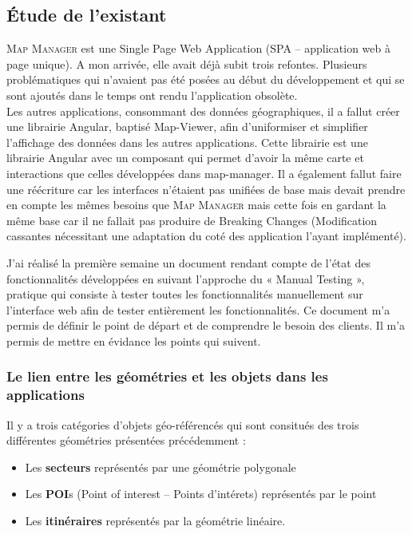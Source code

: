 \documentclass{rapportUHA40}
\begin{document}
\subsection{Étude de l'existant}
\textsc{Map Manager} est une Single Page Web Application (SPA – application web à page
unique). A mon arrivée, elle avait déjà subit trois refontes. Plusieurs
problématiques qui n'avaient pas été posées au début du développement et qui se
sont ajoutés dans le temps ont rendu l'application obsolète. \\

Les autres applications, consommant des données géographiques, il a fallut
créer une librairie Angular, baptisé Map-Viewer, afin d'uniformiser et
simplifier l'affichage des données dans les autres applications. Cette
librairie est une librairie Angular avec un composant qui permet d'avoir la
même carte et interactions que celles développées dans map-manager. Il a
également fallut faire une réécriture car les interfaces n'étaient pas unifiées
de base mais devait prendre en compte les mêmes besoins que \textsc{Map
  Manager} mais cette fois en gardant la même base car il ne fallait pas produire
de Breaking Changes (Modification cassantes nécessitant une adaptation du coté
des application l'ayant implémenté).

J’ai réalisé la première semaine un document rendant compte de l’état des
fonctionnalités développées en suivant l’approche du « Manual Testing »,
pratique qui consiste à tester toutes les fonctionnalités manuellement sur
l’interface web afin de tester entièrement les fonctionnalités. Ce document m’a
permis de définir le point de départ et de comprendre le besoin des clients. Il
m'a permis de mettre en évidance les points qui suivent.

\subsubsection{Le lien entre les géométries et les objets dans les applications}
Il y a trois catégories d'objets géo-référencés qui sont consitués des trois
différentes géométries présentées précédemment :
\begin{itemize}
  \item Les \textbf{secteurs} représentés par une géométrie polygonale
  \item Les \textbf{POI}s (Point of interest – Points d'intérets) représentés par le
        point
  \item Les \textbf{itinéraires} représentés par la géométrie linéaire. \\
\end{itemize}
\end{document}
